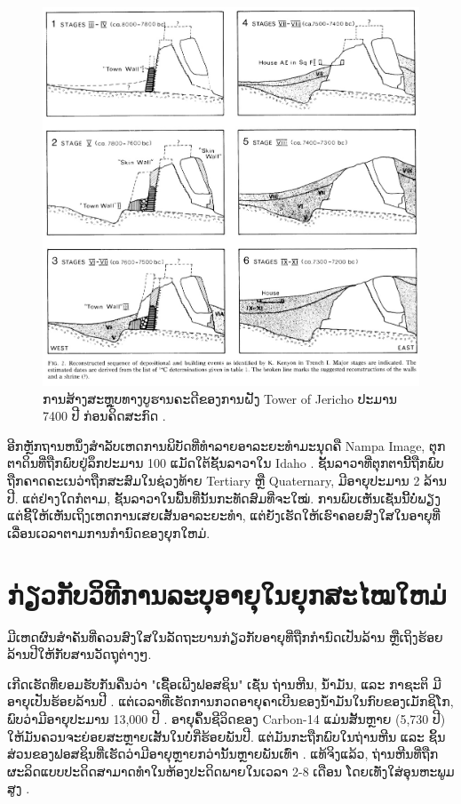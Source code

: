 \documentclass[10pt,twocolumn,letterpaper]{article}
\begin{document}
\begin{figure}[t]
\begin{center}
   \includegraphics[width=1\linewidth]{jericho.jpg}
\end{center}
   \caption{ການສ້າງສະຫຼຸບທາງບູຮານຄະດີຂອງການຝັງ Tower of Jericho ປະມານ 7400 ປີ ກ່ອນຄິດສະກົດ \cite{95}.}
\label{fig:14}
\label{fig:onecol}
\end{figure}

ອີກຫຼັກຖານຫນຶ່ງສໍາລັບເຫດການພິບັດທີ່ທໍາລາຍອາລະຍະທຳມະນຸດຄື Nampa Image, ຕຸກຕາດິນທີ່ຖືກພົບຢູ່ລຶກປະມານ 100 ແມັດໃຕ້ຊັ້ນລາວາໃນ Idaho \cite{102,103}. ຊັ້ນລາວາທີ່ຕຸກຕານີ້ຖືກພົບຖືກຄາດຄະເນວ່າຖືກສະສົມໃນຊ່ວງທ້າຍ Tertiary ຫຼື Quaternary, ມີອາຍຸປະມານ 2 ລ້ານປີ. ແຕ່ຢ່າງໃດກໍຕາມ, ຊັ້ນລາວາໃນພື້ນທີ່ນັ້ນກະທັດສົມທີ່ຈະໃໝ່. ການພົບເຫັນເຊັ່ນນີ້ບໍ່ພຽງແຕ່ຊີ້ໃຫ້ເຫັນເຖິງເຫດການເສຍເສັ້ນອາລະຍະທຳ, ແຕ່ຍັງເຮັດໃຫ້ເຮົາຄອຍສົງໃສໃນອາຍຸທີ່ເລື່ອນເວລາຕາມການກຳນົດຂອງຍຸກໃຫມ່.

\section{ກ່ຽວກັບວິທີການລະບຸອາຍຸໃນຍຸກສະໄໝໃຫມ່}

ມີເຫດຜົນສຳຄັນທີ່ຄວນສົງໃສໃນລັດຖະບານກ່ຽວກັບອາຍຸທີ່ຖືກກຳນົດເປັນລ້ານ ຫຼືເຖິງຮ້ອຍລ້ານປີໃຫ້ກັບສານວັດຖຸຕ່າງໆ.

ເກີດເຮັດທີ່ຍອມຮັບກັນຄື່ນວ່າ "ເຊື້ອເພີງຟອສຊິນ" ເຊັ່ນ ຖ່ານຫີນ, ນ້ຳມັນ, ແລະ ກາຊະຕິ ມີອາຍຸເປັນຮ້ອຍລ້ານປີ \cite{104}. ແຕ່ເວລາທີ່ເຮັດການກວດອາຍຸຄາເບີນຂອງນ້ຳມັນໃນກົບຂອງເມັກຊິໂກ, ພົບວ່າມີອາຍຸປະມານ 13,000 ປີ \cite{105}. ອາຍຸຄຶ້ນຊີວິດຂອງ Carbon-14 ແມ່ນສັ້ນຫຼາຍ (5,730 ປີ) ໃຫ້ມັນຄວນຈະຍ່ອຍສະຫຼາຍເສັ້ນໃນບໍ່ກີ່ຮ້ອຍພັນປີ. ແຕ່ມັນກະຖືກພົບໃນຖ່ານຫີນ ແລະ ຊິ້ນສ່ວນຂອງຟອສຊິນທີ່ເຮັດວ່າມີອາຍຸຫຼາຍກວ່ານັ້ນຫຼາຍພັນເທົ່າ \cite{106}. ແທ້ຈິງແລ້ວ, ຖ່ານຫີນທີ່ຖືກຜະລິດແບບປະດິດສາມາດທໍາໃນຫ້ອງປະດິດພາຍໃນເວລາ 2-8 ເດືອນ ໂດຍເທັ່ງໃສ່ອຸນຫະພູມສູງ \cite{107}.
\end{document}
